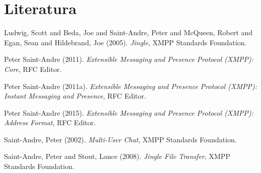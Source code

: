 \documentclass[11pt]{article}
\begin{document}
\section{Literatura}
\label{sec:orge8ee4eb}

\noindent
Ludwig, Scott and Beda, Joe and Saint-Andre, Peter and McQueen, Robert and Egan, Sean and Hildebrand, Joe (2005). \emph{Jingle}, XMPP Standards Foundation.

\noindent
Peter Saint-Andre (2011). \emph{{Extensible Messaging and Presence Protocol (XMPP): Core}}, RFC Editor.

\noindent
Peter Saint-Andre (2011a). \emph{{Extensible Messaging and Presence Protocol (XMPP): Instant Messaging and Presence}}, RFC Editor.

\noindent
Peter Saint-Andre (2015). \emph{{Extensible Messaging and Presence Protocol (XMPP): Address Format}}, RFC Editor.

\noindent
Saint-Andre, Peter (2002). \emph{Multi-User Chat}, XMPP Standards Foundation.

\noindent
Saint-Andre, Peter and Stout, Lance (2008). \emph{Jingle File Transfer}, XMPP Standards Foundation.
\end{document}
